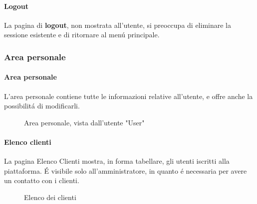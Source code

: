 \documentclass[]{article}
\begin{document}
\paragraph*{Logout}
La pagina di \textbf{logout}, non mostrata all'utente, si preoccupa di eliminare la sessione esistente e di ritornare al menú principale.


\subsubsection{Area personale}
\paragraph*{Area personale}
L'area personale contiene tutte le informazioni relative all'utente, e offre anche la possibilitá di modificarli.
\begin{figure}[H]
	\centering
	\caption{Area personale, vista dall'utente "User"}
\end{figure}
\paragraph*{Elenco clienti}
La pagina Elenco Clienti mostra, in forma tabellare, gli utenti iscritti alla piattaforma. É visibile solo all'amministratore, in quanto é necessaria per avere un contatto con i clienti.
\begin{figure}[H]
	\centering
	\caption{Elenco dei clienti}
\end{figure}
\end{document}
